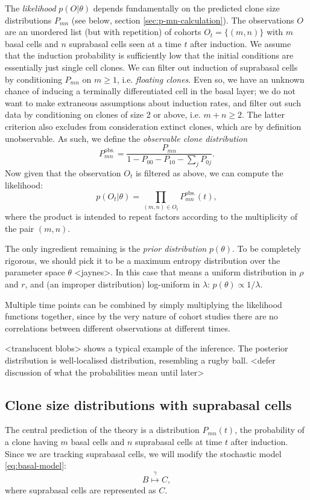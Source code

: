 \documentclass[10pt,UKenglish]{article}
\begin{document}
The \emph{likelihood} $p(O|\theta)$ depends fundamentally on the predicted clone size distributions $P_{mn}$ (see below, section \ref{sec:p-mn-calculation}). The observations $O$ are an unordered list (but with repetition) of cohorts $O_t = \{(m,n)\}$ with $m$ basal cells and $n$ suprabasal cells seen at a time $t$ after induction. We assume that the induction probability is sufficiently low that the initial conditions are essentially just single cell clones. We can filter out induction of suprabasal cells by conditioning $P_{mn}$ on $m \ge 1$, i.e. \emph{floating clones}. Even so, we have an unknown chance of inducing a terminally differentiated cell in the basal layer; we do not want to make extraneous assumptions about induction rates, and filter out such data by conditioning on clones of size 2 or above, i.e. $m+n \ge 2$. The latter criterion also excludes from consideration extinct clones, which are by definition unobservable. As such, we define the \emph{observable clone distribution} $$P^\textrm{obs.}_{mn} = \frac{P_{mn}}{1 - P_{00} - P_{10} - \sum_j P_{0j}}.$$ Now given that the observation $O_t$ is filtered as above, we can compute the likelihood: $$p(O_t|\theta) = \prod_{(m,n) \in O_t} P^\textrm{obs.}_{mn}(t),$$ where the product is intended to repeat factors according to the multiplicity of the pair $(m,n)$.

The only ingredient remaining is the \emph{prior distribution} $p(\theta)$. To be completely rigorous, we should pick it to be a maximum entropy distribution over the parameter space $\theta$ <jaynes>. In this case that means a uniform distribution in $\rho$ and $r$, and (an improper distribution) log-uniform in $\lambda$: $p(\theta) \propto 1/\lambda$.

Multiple time points can be combined by simply multiplying the likelihood functions together, since by the very nature of cohort studies there are no correlations between different observations at different times.

<translucent blobs> shows a typical example of the inference. The posterior distribution is well-localised distribution, resembling a rugby ball. <defer discussion of what the probabilities mean until later>

\subsection{\label{sec:p-mn-calculation}Clone size distributions with suprabasal cells}

The central prediction of the theory is a distribution $P_{mn}(t)$, the probability of a clone having $m$ basal cells and $n$ suprabasal cells at time $t$ after induction. Since we are tracking suprabasal cells, we will modify the stochastic model \ref{eq:basal-model}:
\begin{equation*}
B \overset{\gamma}{\longmapsto} C,
\end{equation*}
where suprabasal cells are represented as $C$.
\end{document}
